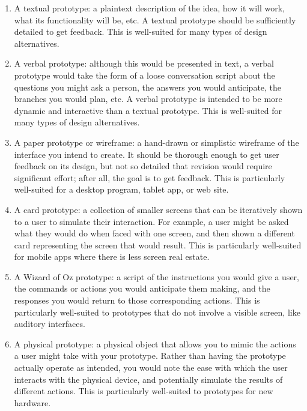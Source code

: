 \begin{enumerate}
\item
  A textual prototype: a plaintext description of the idea, how it will work, what its functionality will be, etc. A textual prototype should be sufficiently detailed to get feedback. This is well-suited for many types of design alternatives.
\item
  A verbal prototype: although this would be presented in text, a verbal prototype would take the form of a loose conversation script about the questions you might ask a person, the answers you would anticipate, the branches you would plan, etc. A verbal prototype is intended to be more dynamic and interactive than a textual prototype. This is well-suited for many types of design alternatives.
\item
  A paper prototype or wireframe: a hand-drawn or simplistic wireframe of the interface you intend to create. It should be thorough enough to get user feedback on its design, but not so detailed that revision would require significant effort; after all, the goal is to get feedback. This is particularly well-suited for a desktop program, tablet app, or web site.
\item
  A card prototype: a collection of smaller screens that can be iteratively shown to a user to simulate their interaction. For example, a user might be asked what they would do when faced with one screen, and then shown a different card representing the screen that would result. This is particularly well-suited for mobile apps where there is less screen real estate.
\item
  A Wizard of Oz prototype: a script of the instructions you would give a user, the commands or actions you would anticipate them making, and the responses you would return to those corresponding actions. This is particularly well-suited to prototypes that do not involve a visible screen, like auditory interfaces.
\item
  A physical prototype: a physical object that allows you to mimic the actions a user might take with your prototype. Rather than having the prototype actually operate as intended, you would note the ease with which the user interacts with the physical device, and potentially simulate the results of different actions. This is particularly well-suited to prototypes for new hardware.
\end{enumerate}



